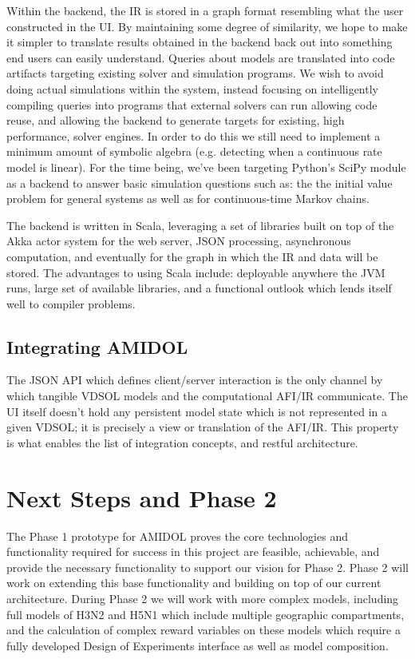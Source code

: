 \documentclass[11pt]{article}
\newcommand{\amidol}{\textsc{AMIDOL}}
\begin{document}
Within the backend, the IR is stored in a graph format resembling what the user constructed in the UI. By maintaining some degree of similarity, we hope to make it simpler to translate results obtained in the backend back out into something end users can easily understand. Queries about models are translated into code artifacts targeting existing solver and simulation programs. We wish to avoid doing actual simulations within the system, instead focusing on intelligently compiling queries into programs that external solvers can run allowing code reuse, and allowing the backend to generate targets for existing, high performance, solver engines. In order to do this we still need to implement a minimum amount of symbolic algebra (e.g. detecting when a continuous rate  model is linear). For the time being, we’ve been targeting Python’s SciPy module as a backend to answer basic simulation questions such as: the the initial value problem for general systems as well as for continuous-time Markov chains.

The backend is written in Scala, leveraging a set of libraries built on top of the Akka actor system for the web server, JSON processing, asynchronous computation, and eventually for the graph in which the IR and data will be stored. The advantages to using Scala include: deployable anywhere the JVM runs, large set of available libraries, and a functional outlook which lends itself well to compiler problems.

\subsection{Integrating AMIDOL}

The JSON API which defines client/server interaction is the only channel by which tangible VDSOL models and the computational AFI/IR communicate. The UI itself doesn't hold any persistent model state which is not represented in a given VDSOL; it is precisely a view or translation of the AFI/IR. This property is what enables the list of integration concepts, and restful architecture.

\section{Next Steps and Phase 2}

The Phase 1 prototype for \amidol{} proves the core technologies and functionality required for success in this project are feasible, achievable, and provide the necessary functionality to support our vision for Phase 2.  Phase 2 will work on extending this base functionality and building on top of our current architecture.  During Phase 2 we will work with more complex models, including full models of H3N2 and H5N1 which include multiple geographic compartments, and the calculation of complex reward variables on these models which require a fully developed Design of Experiments interface as well as model composition.
\end{document}
